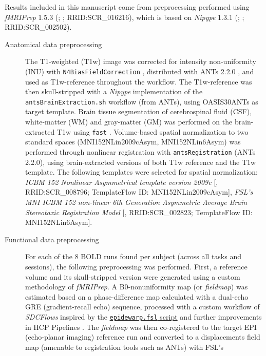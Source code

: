 \documentclass[]{article}
\date{}
\begin{document}
Results included in this manuscript come from preprocessing performed
using \emph{fMRIPrep} 1.5.3 (\citet{fmriprep1}; \citet{fmriprep2};
RRID:SCR\_016216), which is based on \emph{Nipype} 1.3.1
(\citet{nipype1}; \citet{nipype2}; RRID:SCR\_002502).

\begin{description}
\item[Anatomical data preprocessing]
The T1-weighted (T1w) image was corrected for intensity non-uniformity
(INU) with \texttt{N4BiasFieldCorrection} \citep{n4}, distributed with
ANTs 2.2.0 \citep[RRID:SCR\_004757]{ants}, and used as T1w-reference
throughout the workflow. The T1w-reference was then skull-stripped with
a \emph{Nipype} implementation of the \texttt{antsBrainExtraction.sh}
workflow (from ANTs), using OASIS30ANTs as target template. Brain tissue
segmentation of cerebrospinal fluid (CSF), white-matter (WM) and
gray-matter (GM) was performed on the brain-extracted T1w using
\texttt{fast} \citep[FSL 5.0.9, RRID:SCR\_002823,][]{fsl_fast}.
Volume-based spatial normalization to two standard spaces
(MNI152NLin2009cAsym, MNI152NLin6Asym) was performed through nonlinear
registration with \texttt{antsRegistration} (ANTs 2.2.0), using
brain-extracted versions of both T1w reference and the T1w template. The
following templates were selected for spatial normalization: \emph{ICBM
152 Nonlinear Asymmetrical template version 2009c}
{[}\citet{mni152nlin2009casym}, RRID:SCR\_008796; TemplateFlow ID:
MNI152NLin2009cAsym{]}, \emph{FSL's MNI ICBM 152 non-linear 6th
Generation Asymmetric Average Brain Stereotaxic Registration Model}
{[}\citet{mni152nlin6asym}, RRID:SCR\_002823; TemplateFlow ID:
MNI152NLin6Asym{]}.
\item[Functional data preprocessing]
For each of the 8 BOLD runs found per subject (across all tasks and
sessions), the following preprocessing was performed. First, a reference
volume and its skull-stripped version were generated using a custom
methodology of \emph{fMRIPrep}. A B0-nonuniformity map (or
\emph{fieldmap}) was estimated based on a phase-difference map
calculated with a dual-echo GRE (gradient-recall echo) sequence,
processed with a custom workflow of \emph{SDCFlows} inspired by the
\href{http://www.nmr.mgh.harvard.edu/~greve/fbirn/b0/epidewarp.fsl}{\texttt{epidewarp.fsl}
script} and further improvements in HCP Pipelines \citep{hcppipelines}.
The \emph{fieldmap} was then co-registered to the target EPI
(echo-planar imaging) reference run and converted to a displacements
field map (amenable to registration tools such as ANTs) with FSL's

\end{description}
\end{document}
